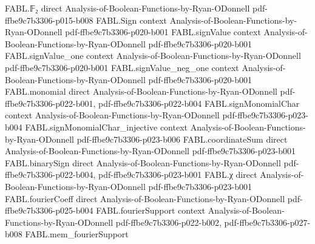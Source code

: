 \begin{theorem}
\label{FABL.relativeHammingDist_truncateWidth_le_of_size_le}
\leanok
{}
\proofstep
  {FABL.𝔽₂}
  {direct}
  {Analysis-of-Boolean-Functions-by-Ryan-ODonnell}
  {pdf-ffbe9c7b3306-p015-b008}
\proofstep
  {FABL.Sign}
  {context}
  {Analysis-of-Boolean-Functions-by-Ryan-ODonnell}
  {pdf-ffbe9c7b3306-p020-b001}
\proofstep
  {FABL.signValue}
  {context}
  {Analysis-of-Boolean-Functions-by-Ryan-ODonnell}
  {pdf-ffbe9c7b3306-p020-b001}
\proofstep
  {FABL.signValue_one}
  {context}
  {Analysis-of-Boolean-Functions-by-Ryan-ODonnell}
  {pdf-ffbe9c7b3306-p020-b001}
\proofstep
  {FABL.signValue_neg_one}
  {context}
  {Analysis-of-Boolean-Functions-by-Ryan-ODonnell}
  {pdf-ffbe9c7b3306-p020-b001}
\proofstep
  {FABL.monomial}
  {direct}
  {Analysis-of-Boolean-Functions-by-Ryan-ODonnell}
  {pdf-ffbe9c7b3306-p022-b001,
    pdf-ffbe9c7b3306-p022-b004}
\proofstep
  {FABL.signMonomialChar}
  {context}
  {Analysis-of-Boolean-Functions-by-Ryan-ODonnell}
  {pdf-ffbe9c7b3306-p023-b004}
\proofstep
  {FABL.signMonomialChar_injective}
  {context}
  {Analysis-of-Boolean-Functions-by-Ryan-ODonnell}
  {pdf-ffbe9c7b3306-p023-b006}
\proofstep
  {FABL.coordinateSum}
  {direct}
  {Analysis-of-Boolean-Functions-by-Ryan-ODonnell}
  {pdf-ffbe9c7b3306-p023-b001}
\proofstep
  {FABL.binarySign}
  {direct}
  {Analysis-of-Boolean-Functions-by-Ryan-ODonnell}
  {pdf-ffbe9c7b3306-p022-b004,
    pdf-ffbe9c7b3306-p023-b001}
\proofstep
  {FABL.χ}
  {direct}
  {Analysis-of-Boolean-Functions-by-Ryan-ODonnell}
  {pdf-ffbe9c7b3306-p023-b001}
\proofstep
  {FABL.fourierCoeff}
  {direct}
  {Analysis-of-Boolean-Functions-by-Ryan-ODonnell}
  {pdf-ffbe9c7b3306-p025-b004}
\proofstep
  {FABL.fourierSupport}
  {context}
  {Analysis-of-Boolean-Functions-by-Ryan-ODonnell}
  {pdf-ffbe9c7b3306-p022-b002,
    pdf-ffbe9c7b3306-p027-b008}
\proofstep
  {FABL.mem_fourierSupport}

\end{theorem}
